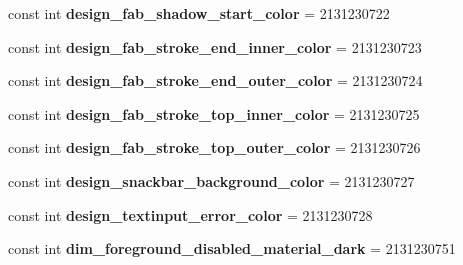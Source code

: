 \begin{DoxyCompactItemize}
\item 
\hypertarget{classClient_1_1Droid_1_1Resource_1_1Color_a74777f4c17a27d62ae154683af1d478d}{}const int {\bfseries design\+\_\+fab\+\_\+shadow\+\_\+start\+\_\+color} = 2131230722\label{classClient_1_1Droid_1_1Resource_1_1Color_a74777f4c17a27d62ae154683af1d478d}

\item 
\hypertarget{classClient_1_1Droid_1_1Resource_1_1Color_a1d304ba4303f449389cfcdf9d4b5ef9b}{}const int {\bfseries design\+\_\+fab\+\_\+stroke\+\_\+end\+\_\+inner\+\_\+color} = 2131230723\label{classClient_1_1Droid_1_1Resource_1_1Color_a1d304ba4303f449389cfcdf9d4b5ef9b}

\item 
\hypertarget{classClient_1_1Droid_1_1Resource_1_1Color_a59f6829a360375a0c62f221c8bb30aba}{}const int {\bfseries design\+\_\+fab\+\_\+stroke\+\_\+end\+\_\+outer\+\_\+color} = 2131230724\label{classClient_1_1Droid_1_1Resource_1_1Color_a59f6829a360375a0c62f221c8bb30aba}

\item 
\hypertarget{classClient_1_1Droid_1_1Resource_1_1Color_a629c80f3a264ae1a029084ad9d6180ec}{}const int {\bfseries design\+\_\+fab\+\_\+stroke\+\_\+top\+\_\+inner\+\_\+color} = 2131230725\label{classClient_1_1Droid_1_1Resource_1_1Color_a629c80f3a264ae1a029084ad9d6180ec}

\item 
\hypertarget{classClient_1_1Droid_1_1Resource_1_1Color_aa342cabe54fe5becf56a5e44f8e5201a}{}const int {\bfseries design\+\_\+fab\+\_\+stroke\+\_\+top\+\_\+outer\+\_\+color} = 2131230726\label{classClient_1_1Droid_1_1Resource_1_1Color_aa342cabe54fe5becf56a5e44f8e5201a}

\item 
\hypertarget{classClient_1_1Droid_1_1Resource_1_1Color_a98b3817a9a25c08fc25cf035f1b8f20f}{}const int {\bfseries design\+\_\+snackbar\+\_\+background\+\_\+color} = 2131230727\label{classClient_1_1Droid_1_1Resource_1_1Color_a98b3817a9a25c08fc25cf035f1b8f20f}

\item 
\hypertarget{classClient_1_1Droid_1_1Resource_1_1Color_a3ef708d341ef1183da2308ff826d3e63}{}const int {\bfseries design\+\_\+textinput\+\_\+error\+\_\+color} = 2131230728\label{classClient_1_1Droid_1_1Resource_1_1Color_a3ef708d341ef1183da2308ff826d3e63}

\item 
\hypertarget{classClient_1_1Droid_1_1Resource_1_1Color_a922804a104adf820b3a1e57d2030e3c8}{}const int {\bfseries dim\+\_\+foreground\+\_\+disabled\+\_\+material\+\_\+dark} = 2131230751\label{classClient_1_1Droid_1_1Resource_1_1Color_a922804a104adf820b3a1e57d2030e3c8}


\end{DoxyCompactItemize}
